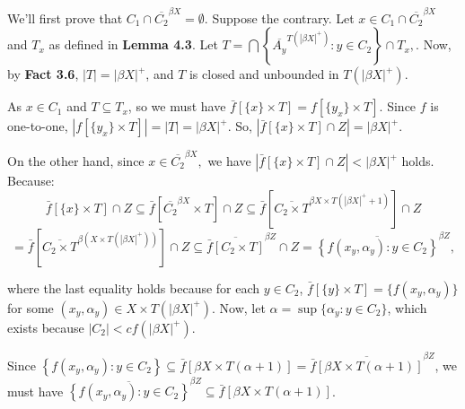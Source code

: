 \documentclass{article}
\begin{document}
																																			      \vskip 15pt
																																			      We'll first prove that $C_1\cap \overline{C_2}^{\beta X}=\emptyset$. 
																																			      Suppose the contrary. Let $x\in C_1\cap \overline{C_2}^{\beta X}$ and $T_x$ as defined in \textbf{Lemma 4.3}. 
																																			      Let $T=\bigcap \left\{ \overline{A_y}^{T(|\beta X|^+)} : y\in C_2 \right\}  \cap T_x,$. Now, by \textbf{Fact 3.6}, $|T|=\left|\beta X\right|^+ $, and $T$ is closed and unbounded in $T(\left|\beta X \right| ^+)$. \\

																																			      \vskip 10pt

																																			      As $x\in C_1$ and $T\subseteq T_x$, so we must have $\bar{f}\left[\{x\} \times T \right] = f\left[\{y_x\}\times T\right].$ Since $f$ is one-to-one, $\left|f\left[\{y_x\}\times T\right]\right|=|T|=\left|\beta X \right| ^+$. So, $\left|\bar{f}\left[\{x\}\times T\right]\cap Z\right|=|\beta X|^+.$

																																			      \vskip 5pt
																																			      On the other hand, since $x\in \overline{C_2}^{\beta X},$ we have $\left|\bar{f}\left[\{x\} \times T \right] \cap Z \right| < \left|\beta X \right|^+$ holds. Because: \\
																																				  $$\bar{f}\left[\{x\}\times T\right] \cap Z 
																																				  \subseteq \bar{f}\left[\overline{C_2}^{\beta X} \times T\right] \cap Z 
																																				  \subseteq \bar{f}\left[\overline{C_2\times T}^{\beta X \times T(|\beta X|^+ +1)}\right] \cap Z$$
																																				  $$=\bar{f}\left[\overline{C_2\times T}^{\beta \left(X \times T(|\beta X|^+ )\right)}\right] \cap Z
																																				  \subseteq \overline{\bar{f}\left[C_2\times T\right]}^{\beta Z} \cap Z
																																				  =\overline{    \left\{ f(x_y,\alpha_y): y\in C_2 \right\}        }^{\beta Z},$$

																																				  where the last equality holds because for each $y\in C_2$, $\bar{f}\left[\{y\}\times T \right]=\{f(x_y,\alpha_y)\}$ for some $(x_y,\alpha_y)\in X\times T(|\beta X|^+).$ Now, let $\alpha=\sup\{\alpha_y: y\in C_2\}$, which exists because $|C_2|< cf\left( \left|\beta X\right|^+ \right)$. 

																																				  Since $\left\{ f(x_y,\alpha_y): y\in C_2 \right\} 
																																				  \subseteq \bar{f}\left[\beta X \times T(\alpha +1) \right] = \overline{ \bar{f}\left[\beta X \times T(\alpha +1) \right]}^{\beta Z}$, we must have $\overline{    \left\{ f(x_y,\alpha_y): y\in C_2 \right\}        }^{\beta Z} \subseteq \bar{f}\left[\beta X \times T(\alpha +1) \right] $. 
\end{document}
